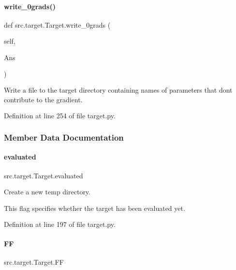 \paragraph{\texorpdfstring{write\+\_\+0grads()}{write\_0grads()}}
{\footnotesize\ttfamily def src.\+target.\+Target.\+write\+\_\+0grads (\begin{DoxyParamCaption}\item[{}]{self,  }\item[{}]{Ans }\end{DoxyParamCaption})}



Write a file to the target directory containing names of parameters that don\textquotesingle{}t contribute to the gradient. 



Definition at line 254 of file target.\+py.



\subsubsection{Member Data Documentation}
\mbox{\label{classsrc_1_1target_1_1Target_a49df3701811acb53bcabb298a101ac2b}} 
\paragraph{\texorpdfstring{evaluated}{evaluated}}
{\footnotesize\ttfamily src.\+target.\+Target.\+evaluated}



Create a new temp directory. 

This flag specifies whether the target has been evaluated yet. 

Definition at line 197 of file target.\+py.

\mbox{\label{classsrc_1_1target_1_1Target_a64e2f22daa347019ca8beb482c4b59f6}} 
\paragraph{\texorpdfstring{FF}{FF}}
{\footnotesize\ttfamily src.\+target.\+Target.\+FF}



